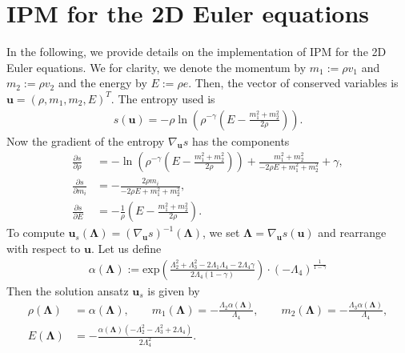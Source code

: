 \appendix
\section{IPM for the 2D Euler equations}
\label{app:IPM2DEuler}

In the following, we provide details on the implementation of IPM for the 2D Euler equations. We for clarity, we denote the momentum by $m_1 := \rho v_1$ and $m_2:=\rho v_2$ and the energy by $E:=\rho e$. Then, the vector of conserved variables is $\bm u = (\rho,m_1,m_2,E)^T$. The entropy used is
\begin{align*}
s(\bm u) = -\rho \ln \left(\rho^{-\gamma} \left(E - \frac{m_1^2 + m_2^2}{2
\rho}\right)\right).
\end{align*}
Now the gradient of the entropy $\nabla_{\bm u} s$ has the components
\begin{align*}
\frac{\partial s}{\partial \rho} &= -\ln \left(\rho^{-\gamma}\left(E-\frac{m_1^2+m_2^2}{2 \rho }\right)\right)+\frac{m_1^2+m_2^2}{-2 \rho  E+m_1^2+m_2^2}+\gamma, \\
\frac{\partial s}{\partial m_i} &= -\frac{2\rho  m_i}{-2 \rho  E+m_1^2+m_2^2}, \\
\frac{\partial s}{\partial E} &=-\frac1\rho\left(E-\frac{m_1^2+m_2^2}{2 \rho }\right).
\end{align*}
To compute $\bm u_s(\bm\Lambda) = (\nabla_{\bm u}s)^{-1}(\bm \Lambda)$, we set $\bm \Lambda = \nabla_{\bm u}s(\bm u)$ and rearrange with respect to $\bm u$. Let us define
\begin{align*}
\alpha(\bm\Lambda) := \text{exp}\left(\frac{ \Lambda_2^2 + \Lambda_3^2 - 2\Lambda_1  \Lambda_4 - 2 \Lambda_4  \gamma }{ 2 \Lambda_4(1-\gamma) } \right) \cdot (-\Lambda_4)^{\frac{1}{1-\gamma}}
\end{align*}
Then the solution ansatz $\bm u_s$ is given by
\begin{align*}
\rho(\bm\Lambda) &= \alpha(\bm\Lambda),\qquad m_1(\bm\Lambda) = -\frac{\Lambda_2 \alpha(\bm{\Lambda})}{\Lambda_4},\qquad m_2(\bm\Lambda) = -\frac{\Lambda_3 \alpha(\bm{\Lambda})}{\Lambda_4}, \\
E(\bm\Lambda) &= -\frac{  \alpha(\bm{\Lambda}) ( -\Lambda_2^2 - \Lambda_3^2 + 2\Lambda_4 ) }{ 2 \Lambda_4^2}.
\end{align*}